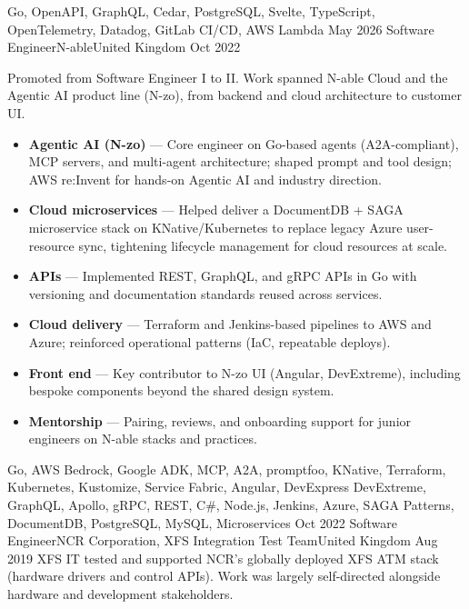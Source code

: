 \begin{experiences}
{\begin{itemize}
                      \end{itemize}
                    }
                    {Go, OpenAPI, GraphQL, Cedar, PostgreSQL, Svelte, TypeScript, OpenTelemetry, Datadog, GitLab CI/CD, AWS Lambda}
  \emptySeparator
  \experience
    {May 2026}  {Software Engineer}{N-able}{United Kingdom}
    {Oct 2022} {
                      Promoted from Software Engineer I to II. Work spanned N-able Cloud and the Agentic AI product line (N-zo), from backend and cloud architecture to customer UI.
                      \begin{itemize}
                        \item \textbf{Agentic AI (N-zo)} --- Core engineer on Go-based agents (A2A-compliant), MCP servers, and multi-agent architecture; shaped prompt and tool design; AWS re:Invent for hands-on Agentic AI and industry direction.
                        \item \textbf{Cloud microservices} --- Helped deliver a DocumentDB + SAGA microservice stack on KNative/Kubernetes to replace legacy Azure user-resource sync, tightening lifecycle management for cloud resources at scale.
                        \item \textbf{APIs} --- Implemented REST, GraphQL, and gRPC APIs in Go with versioning and documentation standards reused across services.
                        \item \textbf{Cloud delivery} --- Terraform and Jenkins-based pipelines to AWS and Azure; reinforced operational patterns (IaC, repeatable deploys).
                        \item \textbf{Front end} --- Key contributor to N-zo UI (Angular, DevExtreme), including bespoke components beyond the shared design system.
                        \item \textbf{Mentorship} --- Pairing, reviews, and onboarding support for junior engineers on N-able stacks and practices.
                      \end{itemize}
                    }
                    {Go, AWS Bedrock, Google ADK, MCP, A2A, promptfoo, KNative, Terraform, Kubernetes, Kustomize, Service Fabric, Angular, DevExpress DevExtreme, GraphQL, Apollo, gRPC, REST, C\#, Node.js, Jenkins, Azure, SAGA Patterns, DocumentDB, PostgreSQL, MySQL, Microservices}
  \emptySeparator
  \experience
    {Oct 2022} {Software Engineer}{NCR Corporation, XFS Integration Test Team}{United Kingdom}
    {Aug 2019}    {
                      XFS IT tested and supported NCR's globally deployed XFS ATM stack (hardware drivers and control APIs). Work was largely self-directed alongside hardware and development stakeholders.
}
\end{experiences}
